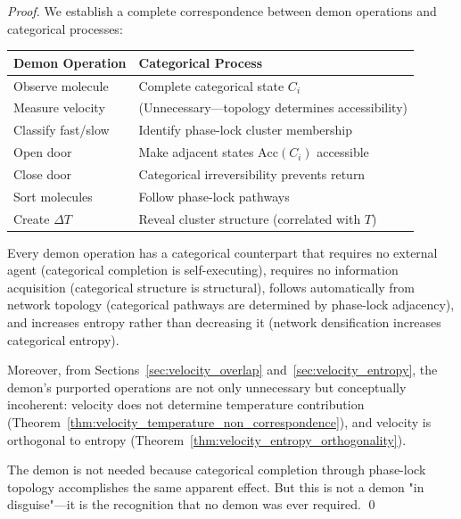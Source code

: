 \documentclass[12pt,a4paper]{article}
\theoremstyle{definition}
\theoremstyle{remark}
\newcommand{\accessible}{\text{Acc}}
\begin{document}
\begin{proof}
We establish a complete correspondence between demon operations and categorical processes:

\begin{center}
\begin{tabular}{l|l}
\textbf{Demon Operation} & \textbf{Categorical Process} \\
\hline
Observe molecule & Complete categorical state $C_i$ \\
Measure velocity & (Unnecessary—topology determines accessibility) \\
Classify fast/slow & Identify phase-lock cluster membership \\
Open door & Make adjacent states $\accessible(C_i)$ accessible \\
Close door & Categorical irreversibility prevents return \\
Sort molecules & Follow phase-lock pathways \\
Create $\Delta T$ & Reveal cluster structure (correlated with $T$)
\end{tabular}
\end{center}

Every demon operation has a categorical counterpart that requires no external agent (categorical completion is self-executing), requires no information acquisition (categorical structure is structural), follows automatically from network topology (categorical pathways are determined by phase-lock adjacency), and increases entropy rather than decreasing it (network densification increases categorical entropy).

Moreover, from Sections~\ref{sec:velocity_overlap} and~\ref{sec:velocity_entropy}, the demon's purported operations are not only unnecessary but conceptually incoherent: velocity does not determine temperature contribution (Theorem~\ref{thm:velocity_temperature_non_correspondence}), and velocity is orthogonal to entropy (Theorem~\ref{thm:velocity_entropy_orthogonality}).

The demon is not needed because categorical completion through phase-lock topology accomplishes the same apparent effect. But this is not a demon "in disguise"—it is the recognition that no demon was ever required. \qed
\end{proof}
\end{document}
